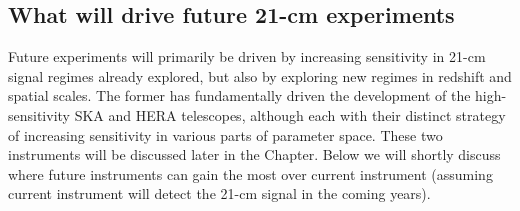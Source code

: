 \subsection{What will drive future 21-cm experiments}

Future experiments will primarily be driven by increasing sensitivity in 21-cm signal regimes already explored, but also by exploring new regimes in redshift and spatial scales. The former has fundamentally driven the development of the high-sensitivity SKA and HERA telescopes, although each with their distinct strategy of increasing sensitivity in various parts of parameter space. These two instruments will be discussed later in the Chapter. Below we will shortly discuss where future instruments can gain the most over current instrument (assuming current instrument will detect the 21-cm signal in the coming years). 

